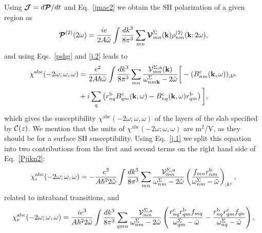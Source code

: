 \documentclass[floatfix,prb,aps,superscriptaddress,showpacs,11pt,preprint,letterpaper]{revtex4}
\begin{document}
Using
$\boldsymbol{\mathcal{\cal J}}=d\boldsymbol{\mathcal{\cal P}}/dt$ 
and Eq.~\eqref{jmac2} 
we obtain the SH polarization of a given region as
\begin{equation}\label{Pjikn}
\boldsymbol{\mathcal{\cal P}}^{(2)}(2\omega)
=\frac{ie}{2A\tilde\omega}
\int \frac{dk^3}{8\pi^3}
\sum_{mn}
\boldsymbol{\mathcal{\cal V}}^{\Sigma}_{mn}(\mathbf{k})
\rho^{(2)}_{nm}(\mathbf{k};2\omega)
,
\end{equation}
and using Eqs.~\eqref{pshg} and \eqref{j.2} 
leads to
\begin{align}\label{Pjikn2}
\chi^{\mathrm{a}\mathrm{b}\mathrm{c}}(-2\omega;\omega,\omega) 
&=
\frac{e^2}{2A\hbar\tilde\omega}
\int \frac{dk^3}{8\pi^3}
\sum_{mn}
\frac{{\mathbf{\cal V}}^{\Sigma,\mathrm{a}}_{mn}(\mathbf{k})}
{\omega^\Sigma_{nm\mathbf{k}}-2\tilde\omega}
\bigg[
-(B_{nm}^{\mathrm{c}}(\mathbf{k},\omega))_{;k^{\mathrm{b}}}
\nonumber \\
&
+i\sum_q\left(r_{nq}^{\mathrm{b}}B_{qm}^{\mathrm{c}}(\mathbf{k},\omega) -
  B_{nq}^{\mathrm{c}}(\mathbf{k},\omega) 
  r_{qm}^{\mathrm{b}}\right)
\bigg]
,
\end{align}
which gives the susceptibility 
$\chi^{\mathrm{a}\mathrm{b}\mathrm{c}}(-2\omega;\omega,\omega)$ 
of the layers of the slab specified by ${\mathbf{\cal C}}(z)$. 
We mention that the units of 
$\chi^{\mathrm{a}\mathrm{b}\mathrm{c}}(-2\omega;\omega,\omega)$
are m$^2$/V, as they should be for a surface SH susceptibility.
Using Eq.~\eqref{j.1} we
split this equation into
two contributions from the first and second terms on the right hand side
of Eq.~\eqref{Pjikn2}:
\begin{equation}\label{chii}
\chi^{\mathrm{a}\mathrm{b}\mathrm{c}}_i (-2\omega;\omega,\omega)
=-\frac{e^3}{A\hbar^22\tilde\omega}
\int \frac{dk^3}{8\pi^3}
\sum_{mn}
\frac{{\mathbf{\cal V}}_{mn}^{\Sigma,\mathrm{a}}}{\omega^\Sigma_{nm}-2\tilde\omega}
\left(\frac{f_{mn}r_{nm}^{\mathrm{b}}}{\omega^\Sigma_{nm}-\tilde\omega}\right)_{;k^{\mathrm{c}}}
,
\end{equation} 
related to intraband transitions, and 
\begin{equation}\label{chie}
\chi^{\mathrm{a}\mathrm{b}\mathrm{c}}_e (-2\omega;\omega,\omega)
=\frac{ie^3}{A\hbar^22\tilde\omega}
\int \frac{dk^3}{8\pi^3}
\sum_{qmn}
\frac{{\mathbf{\cal V}}_{mn}^{\Sigma,\mathrm{a}}}{\omega^\Sigma_{nm}-2\tilde\omega}
\left(
\frac{r_{nq}^{\mathrm{c}} r_{qm}^{\mathrm{b}} 
f_{mq}}{\omega^\Sigma_{qm}-\tilde\omega}
-\frac{r_{nq}^{\mathrm{b}} r_{qm}^{\mathrm{c}} 
f_{qn}}{\omega^\Sigma_{nq}-\tilde\omega}
\right),
\end{equation} 
\end{document}
